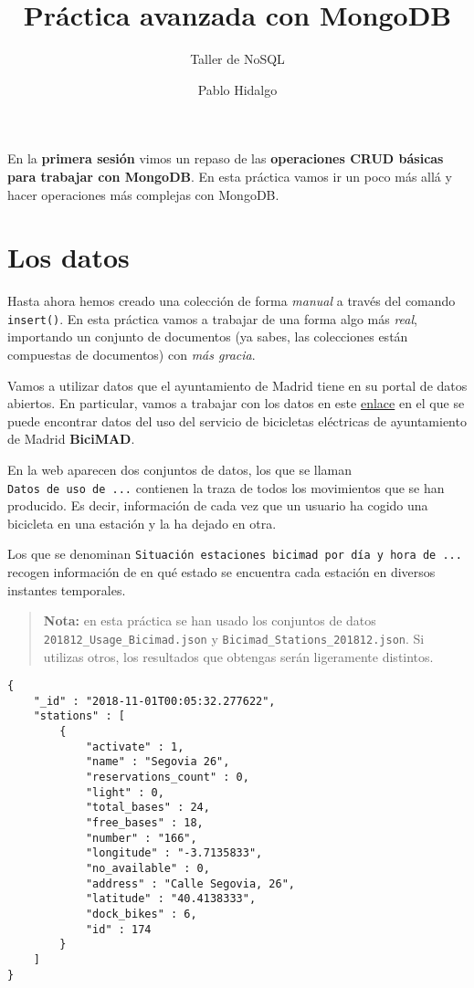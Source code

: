\documentclass[]{article}
\title{Práctica avanzada con MongoDB}
\subtitle{Taller de NoSQL}
\author{Pablo Hidalgo}
\date{}
\begin{document}
\maketitle

En la \textbf{primera sesión} vimos un repaso de las \textbf{operaciones
CRUD básicas para trabajar con MongoDB}. En esta práctica vamos ir un
poco más allá y hacer operaciones más complejas con MongoDB.

\hypertarget{los-datos}{%
\section{Los datos}\label{los-datos}}

Hasta ahora hemos creado una colección de forma \emph{manual} a través
del comando \texttt{insert()}. En esta práctica vamos a trabajar de una
forma algo más \emph{real}, importando un conjunto de documentos (ya
sabes, las colecciones están compuestas de documentos) con \emph{más
gracia}.

Vamos a utilizar datos que el ayuntamiento de Madrid tiene en su portal
de datos abiertos. En particular, vamos a trabajar con los datos en este
\href{https://opendata.emtmadrid.es/Datos-estaticos/Datos-generales-(1)}{enlace}
en el que se puede encontrar datos del uso del servicio de bicicletas
eléctricas de ayuntamiento de Madrid \textbf{BiciMAD}.

En la web aparecen dos conjuntos de datos, los que se llaman
\texttt{Datos\ de\ uso\ de\ ...} contienen la traza de todos los
movimientos que se han producido. Es decir, información de cada vez que
un usuario ha cogido una bicicleta en una estación y la ha dejado en
otra.

Los que se denominan
\texttt{Situación\ estaciones\ bicimad\ por\ día\ y\ hora\ de\ ...}
recogen información de en qué estado se encuentra cada estación en
diversos instantes temporales.

\begin{quote}
\textbf{Nota:} en esta práctica se han usado los conjuntos de datos
\texttt{201812\_Usage\_Bicimad.json} y
\texttt{Bicimad\_Stations\_201812.json}. Si utilizas otros, los
resultados que obtengas serán ligeramente distintos.
\end{quote}

\begin{verbatim}
{
    "_id" : "2018-11-01T00:05:32.277622",
    "stations" : [
        {
            "activate" : 1,
            "name" : "Segovia 26",
            "reservations_count" : 0,
            "light" : 0,
            "total_bases" : 24,
            "free_bases" : 18,
            "number" : "166",
            "longitude" : "-3.7135833",
            "no_available" : 0,
            "address" : "Calle Segovia, 26",
            "latitude" : "40.4138333",
            "dock_bikes" : 6,
            "id" : 174
        }
    ]
}
\end{verbatim}
\end{document}
